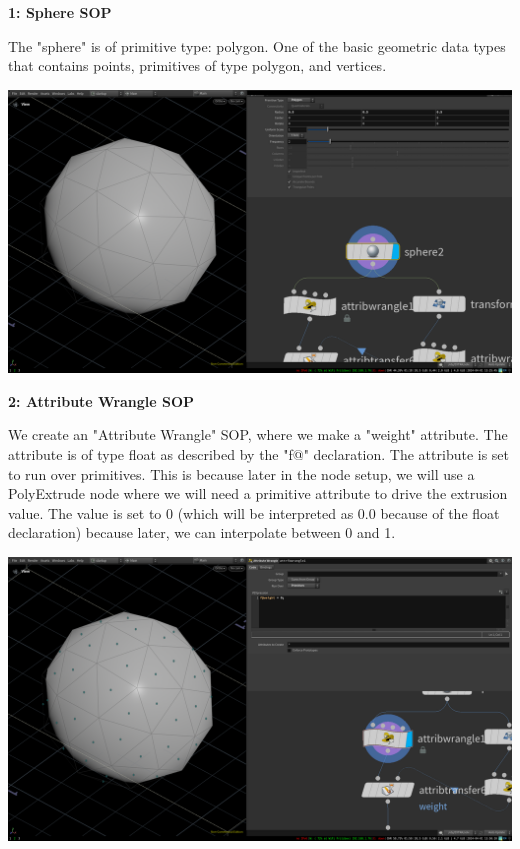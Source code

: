 \documentclass[11pt, a4paper]{article}
\begin{document}
\begin{minipage}[H!]{0.4\textwidth}
	\textbf{1: Sphere SOP} \newline 

 The "sphere" is of primitive type: polygon. One of the basic geometric data
types that contains points, primitives of type polygon, and vertices.  

\end{minipage}
\vspace{1pt}
\begin{minipage}[H]{0.6\textwidth}
	\includegraphics[width=1\textwidth]{media/houdini_fundamentals_1.png}
\end{minipage}



\begin{minipage}[H]{0.4\textwidth}
	\textbf{2: Attribute Wrangle SOP}\newline 

We create an "Attribute Wrangle" SOP, where we make a "weight" attribute. The
attribute is of type float as described by the "f@" declaration. The attribute
is set to run over primitives. This is because later in the node setup, we will
use a PolyExtrude node where we will need a primitive attribute to drive the
extrusion value. The value is set to 0 (which will be interpreted as 0.0
because of the float declaration) because later, we can interpolate between 0
and 1. 
	
 \end{minipage}
\vspace{1pt}
\begin{minipage}[H]{0.6\textwidth}
	\includegraphics[width=1\textwidth]{media/houdini_fundamentals_2.png}
\end{minipage}
\end{document}
